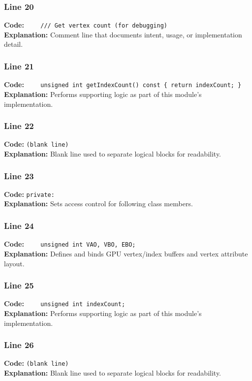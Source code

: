 \documentclass[11pt,a4paper]{article}
\begin{document}
\subsubsection*{Line 20}
\textbf{Code:} \verb|    /// Get vertex count (for debugging)|\\
\textbf{Explanation:} Comment line that documents intent, usage, or implementation detail.

\subsubsection*{Line 21}
\textbf{Code:} \verb|    unsigned int getIndexCount() const { return indexCount; }|\\
\textbf{Explanation:} Performs supporting logic as part of this module's implementation.

\subsubsection*{Line 22}
\textbf{Code:} \texttt{(blank line)}\\
\textbf{Explanation:} Blank line used to separate logical blocks for readability.

\subsubsection*{Line 23}
\textbf{Code:} \verb|private:|\\
\textbf{Explanation:} Sets access control for following class members.

\subsubsection*{Line 24}
\textbf{Code:} \verb|    unsigned int VAO, VBO, EBO;|\\
\textbf{Explanation:} Defines and binds GPU vertex/index buffers and vertex attribute layout.

\subsubsection*{Line 25}
\textbf{Code:} \verb|    unsigned int indexCount;|\\
\textbf{Explanation:} Performs supporting logic as part of this module's implementation.

\subsubsection*{Line 26}
\textbf{Code:} \texttt{(blank line)}\\
\textbf{Explanation:} Blank line used to separate logical blocks for readability.
\end{document}
